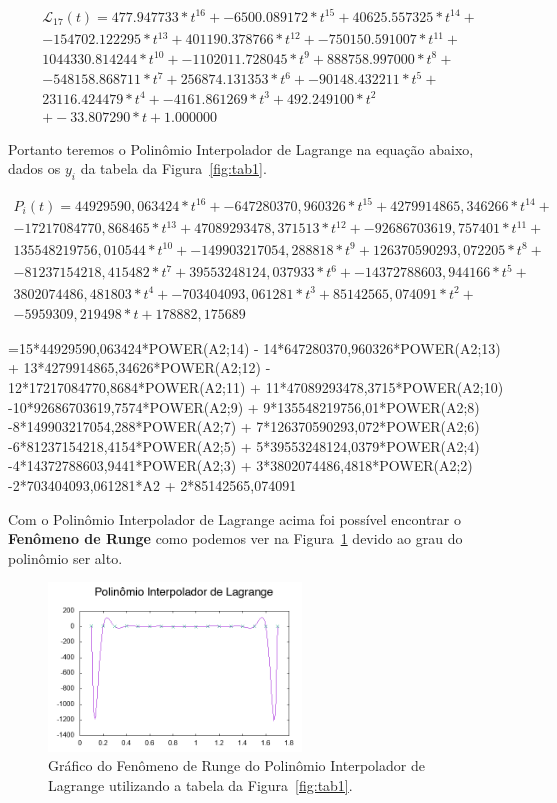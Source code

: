 \documentclass[12pt]{article}
\begin{document}
\begin{gather*}
	\mathcal{L}_{17}(t) = 477.947733*t^{16} + -6500.089172*t^{15} + 40625.557325*t^{14} + \\ -154702.122295*t^{13} + 401190.378766*t^{12} + -750150.591007*t^{11} + \\ 1044330.814244*t^{10} + -1102011.728045*t^{9} + 888758.997000*t^{8} + \\ -548158.868711*t^{7} + 256874.131353*t^{6} + -90148.432211*t^{5} + \\ 23116.424479*t^{4} + -4161.861269*t^{3} + 492.249100*t^{2} \\ + -33.807290*t + 1.000000
\label{eq:degreelagrange}
\end{gather*}

Portanto teremos o Polinômio Interpolador de Lagrange na equação abaixo, dados os $y_{i}$ da tabela da Figura~\ref{fig:tab1}.

\begin{gather*}
P_{i}(t) = 44929590,063424*t^{16} + -647280370,960326*t^{15} + 4279914865,346266*t^{14} + \\ -17217084770,868465*t^{13} + 47089293478,371513*t^{12} + -92686703619,757401*t^{11} + \\ 135548219756,010544*t^{10} + -149903217054,288818*t^{9} + 126370590293,072205*t^{8} + \\ -81237154218,415482*t^{7} + 39553248124,037933*t^{6} + -14372788603,944166*t^{5} + \\ 3802074486,481803*t^{4} + -703404093,061281*t^{3} + 85142565,074091*t^{2} + \\ -5959309,219498*t + 178882,175689
\label{eq:lagrangeq2}
\end{gather*}

=15*44929590,063424*POWER(A2;14) - 14*647280370,960326*POWER(A2;13) + 13*4279914865,34626*POWER(A2;12) - 12*17217084770,8684*POWER(A2;11) + 11*47089293478,3715*POWER(A2;10) -10*92686703619,7574*POWER(A2;9) + 9*135548219756,01*POWER(A2;8) -8*149903217054,288*POWER(A2;7) + 7*126370590293,072*POWER(A2;6)  -6*81237154218,4154*POWER(A2;5) + 5*39553248124,0379*POWER(A2;4) -4*14372788603,9441*POWER(A2;3) + 3*3802074486,4818*POWER(A2;2) -2*703404093,061281*A2 + 2*85142565,074091

Com o Polinômio Interpolador de Lagrange acima foi possível encontrar o \textbf{Fenômeno de Runge} como podemos ver na Figura~\ref{fig:runge} devido ao grau do polinômio ser alto.

\begin{figure}[H]
	\centering
	\includegraphics[width=0.6\textwidth]{p1q2g2.png}
	\caption{Gráfico do Fenômeno de Runge do Polinômio Interpolador de Lagrange utilizando a tabela da Figura~\ref{fig:tab1}.}
	\label{fig:runge}
\end{figure}
\end{document}
